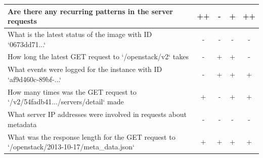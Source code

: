 \documentclass[conference]{IEEEtran}
\begin{document}
\begin{table}
\begin{tabular}{|p{12cm}|c|c|c|c|}
\hline
Are there any recurring patterns in the server requests & \cellcolor{orange!50}++ & \cellcolor{red!30}- & \cellcolor{green!30}+ & \cellcolor{orange!50}++ \\
\hline
What is the latest status of the image with ID `0673dd71...` & \cellcolor{red!30}- & \cellcolor{red!30}- & \cellcolor{red!30}- & \cellcolor{red!30}- \\
\hline
How long the latest GET request to `/openstack/v2` takes & \cellcolor{red!30}- & \cellcolor{green!30}+ & \cellcolor{green!30}+ & \cellcolor{red!30}- \\
\hline
What events were logged for the instance with ID `af9d460c-89bf-...` & \cellcolor{red!30}- & \cellcolor{green!30}+ & \cellcolor{green!30}+ & \cellcolor{green!30}+ \\
\hline
How many times was the GET request to `/v2/54fadb41.../servers/detail` made & \cellcolor{green!30}+ & \cellcolor{red!30}- & \cellcolor{green!30}+ & \cellcolor{green!30}+ \\
\hline
What server IP addresses were involved in requests about metadata & \cellcolor{red!30}- & \cellcolor{red!30}- & \cellcolor{red!30}- & \cellcolor{red!30}- \\
\hline
What was the response length for the GET request to `/openstack/2013-10-17/meta\_data.json` & \cellcolor{green!30}+ & \cellcolor{green!30}+ & \cellcolor{green!30}+ & \cellcolor{green!30}+ \\
\hline
\end{tabular}
\label{tab:qa_results_logs}
\end{table}
\end{document}
